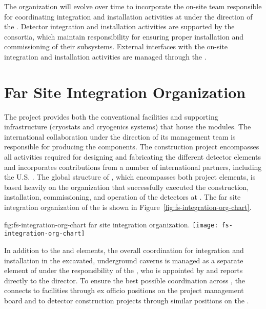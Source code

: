 The  organization will evolve over time to incorporate the 
on-site team responsible for coordinating integration and installation 
activities at  under the direction of the .  
Detector integration and installation activities are supported by the 
 consortia, which maintain responsibility for ensuring 
proper installation and commissioning of their subsystems.  External 
 interfaces with the on-site integration and installation 
activities are managed through the .

\section{Far Site Integration Organization}
\label{sec:exec-tc-partners}

The  project provides both the 
conventional facilities and supporting infrastructure (cryostats 
and cryogenics systems) that house the   
modules.  
The international  
collaboration under the direction of its management team is 
responsible for producing the  components.  The 
  construction project encompasses all 
activities required for designing and fabricating the different 
detector elements and incorporates contributions from a number 
of international partners, including the U.S. .  
The global structure of , which encompasses 
both project elements, is based heavily on 
the organization that successfully executed the construction,
installation, commissioning, and operation of the 
detectors at . 
The 
far site integration organization of the  is shown in Figure~\ref{fig:fs-integration-org-chart}. 

\begin{dunefigure}{fig:fs-integration-org-chart}
  { far site integration organization.}
  \texttt{[image: fs-integration-org-chart]} %
\end{dunefigure}

In addition to the  and  elements, the 
overall coordination for integration and installation  
in the excavated, underground caverns is managed as a separate
element of  under the responsibility of 
the , who is appointed by and reports directly to the 
 director.  To ensure the best possible coordination 
across , the  connects 
to facilities through 
ex officio positions on the  project management board 
and to detector construction projects through similar positions on the  .

